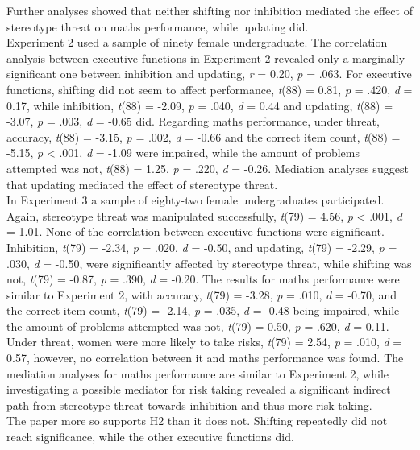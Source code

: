 \documentclass[
  stu,floatsintext]{apa7}
\begin{document}
Further analyses showed that neither shifting nor inhibition mediated the effect of stereotype threat on maths performance, while updating did.\\
Experiment 2 used a sample of ninety female undergraduate.
The correlation analysis between executive functions in Experiment 2 revealed only a marginally significant one between inhibition and updating, \emph{r} = 0.20, \emph{p} = .063.
For executive functions, shifting did not seem to affect performance, \emph{t}(88) = 0.81, \emph{p} = .420, \emph{d} = 0.17, while inhibition, \emph{t}(88) = -2.09, \emph{p} = .040, \emph{d} = 0.44 and updating, \emph{t}(88) = -3.07, \emph{p} = .003, \emph{d} = -0.65 did.
Regarding maths performance, under threat, accuracy, \emph{t}(88) = -3.15, \emph{p} = .002, \emph{d} = -0.66 and the correct item count, \emph{t}(88) = -5.15, \emph{p} \textless{} .001, \emph{d} = -1.09 were impaired, while the amount of problems attempted was not, \emph{t}(88) = 1.25, \emph{p} = .220, \emph{d} = -0.26.
Mediation analyses suggest that updating mediated the effect of stereotype threat.\\
In Experiment 3 a sample of eighty-two female undergraduates participated.
Again, stereotype threat was manipulated successfully, \emph{t}(79) = 4.56, \emph{p} \textless{} .001, \emph{d} = 1.01.
None of the correlation between executive functions were significant.
Inhibition, \emph{t}(79) = -2.34, \emph{p} = .020, \emph{d} = -0.50, and updating, \emph{t}(79) = -2.29, \emph{p} = .030, \emph{d} = -0.50, were significantly affected by stereotype threat, while shifting was not, \emph{t}(79) = -0.87, \emph{p} = .390, \emph{d} = -0.20.
The results for maths performance were similar to Experiment 2, with accuracy, \emph{t}(79) = -3.28, \emph{p} = .010, \emph{d} = -0.70, and the correct item count, \emph{t}(79) = -2.14, \emph{p} = .035, \emph{d} = -0.48 being impaired, while the amount of problems attempted was not, \emph{t}(79) = 0.50, \emph{p} = .620, \emph{d} = 0.11.
Under threat, women were more likely to take risks, \emph{t}(79) = 2.54, \emph{p} = .010, \emph{d} = 0.57, however, no correlation between it and maths performance was found.
The mediation analyses for maths performance are similar to Experiment 2, while investigating a possible mediator for risk taking revealed a significant indirect path from stereotype threat towards inhibition and thus more risk taking.\\
The paper more so supports H2 than it does not. Shifting repeatedly did not reach significance, while the other executive functions did.
\end{document}
